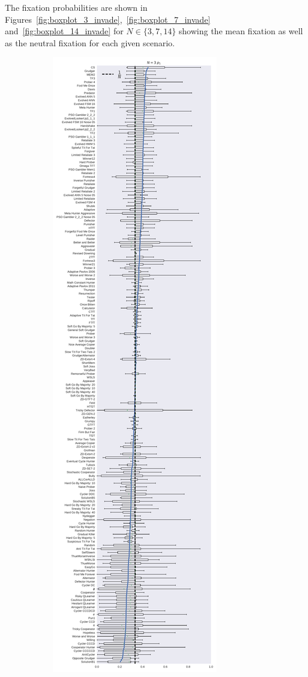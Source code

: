\documentclass{article}
\begin{document}
The fixation
probabilities are shown in
Figures~\ref{fig:boxplot_3_invade},~\ref{fig:boxplot_7_invade}
and~\ref{fig:boxplot_14_invade} for \(N\in\{3, 7, 14\}\) showing the mean
fixation as well as the neutral fixation for each given scenario.

\begin{figure}[!hbtp]
    \centering
    \begin{subfigure}{.3\textwidth}
        \centering
        \includegraphics[height=.9\textheight]{./img/boxplot_3_invade.pdf}

\end{subfigure}
\end{figure}
\end{document}
